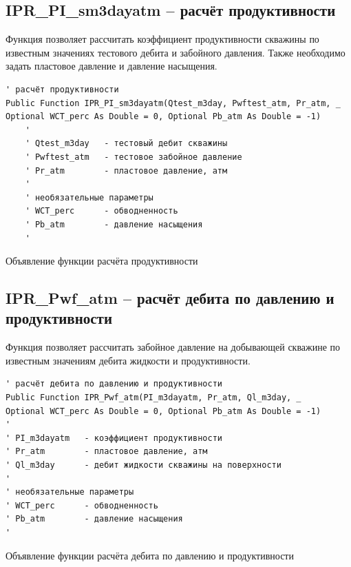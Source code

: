 \documentclass[]{scrreprt}
\begin{document}
\subsection{IPR\_PI\_sm3dayatm – расчёт продуктивности}
Функция позволяет рассчитать коэффициент продуктивности скважины по известным значениях тестового дебита и забойного давления. Также необходимо задать пластовое давление и давление насыщения.
\begin{listing}[H]
	\begin{verbatim}
' расчёт продуктивности
Public Function IPR_PI_sm3dayatm(Qtest_m3day, Pwftest_atm, Pr_atm, _
Optional WCT_perc As Double = 0, Optional Pb_atm As Double = -1)
	'
	' Qtest_m3day   - тестовый дебит скважины
	' Pwftest_atm   - тестовое забойное давление
	' Pr_atm        - пластовое давление, атм
	'
	' необязательные параметры
	' WCT_perc      - обводненность
	' Pb_atm        - давление насыщения
	'
	\end{verbatim}
	\caption{Объявление функции расчёта продуктивности}
	\label{lst:codedIPR_PI}
\end{listing}
\subsection{IPR\_Pwf\_atm – расчёт дебита по давлению и продуктивности}
Функция позволяет рассчитать забойное давление на добывающей скважине по известным значениям дебита жидкости и продуктивности.

\begin{listing}[H]
	\begin{verbatim}
' расчёт дебита по давлению и продуктивности
Public Function IPR_Pwf_atm(PI_m3dayatm, Pr_atm, Ql_m3day, _
Optional WCT_perc As Double = 0, Optional Pb_atm As Double = -1)
'
' PI_m3dayatm   - коэффициент продуктивности
' Pr_atm        - пластовое давление, атм
' Ql_m3day      - дебит жидкости скважины на поверхности
'
' необязательные параметры
' WCT_perc      - обводненность
' Pb_atm        - давление насыщения
'
	\end{verbatim}
	\caption{Объявление функции расчёта дебита по давлению и продуктивности}
	\label{lst:codedIPR_Pwf}
\end{listing}
\end{document}
